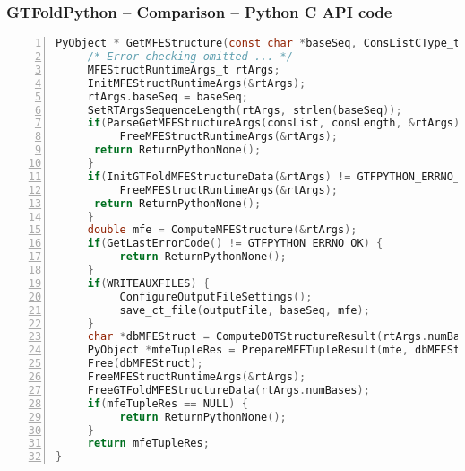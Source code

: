 \documentclass[usenames,svgnames,dvipsnames,11pt]{beamer}
\begin{document}
\begin{frame}[fragile]
\frametitle{GTFoldPython -- Comparison -- Python C API code}

\begin{lstlisting}[language=C,basicstyle=\tiny\ttfamily,keywordstyle=\bfseries\color{green!40!black},
                   commentstyle=\itshape\color{purple!40!black},identifierstyle=\color{blue!63!green},
                   stringstyle=\color{orange},frame=none,keepspaces=true,numbers=left,xleftmargin=0.28cm]
PyObject * GetMFEStructure(const char *baseSeq, ConsListCType_t consList, int consLength) {
     /* Error checking omitted ... */
     MFEStructRuntimeArgs_t rtArgs;
     InitMFEStructRuntimeArgs(&rtArgs);
     rtArgs.baseSeq = baseSeq;
     SetRTArgsSequenceLength(rtArgs, strlen(baseSeq));
     if(ParseGetMFEStructureArgs(consList, consLength, &rtArgs) != GTFPYTHON_ERRNO_OK) {
          FreeMFEStructRuntimeArgs(&rtArgs);
	  return ReturnPythonNone();
     }
     if(InitGTFoldMFEStructureData(&rtArgs) != GTFPYTHON_ERRNO_OK) {
          FreeMFEStructRuntimeArgs(&rtArgs);
	  return ReturnPythonNone();
     }
     double mfe = ComputeMFEStructure(&rtArgs);
     if(GetLastErrorCode() != GTFPYTHON_ERRNO_OK) {
          return ReturnPythonNone();
     }
     if(WRITEAUXFILES) {
          ConfigureOutputFileSettings();
          save_ct_file(outputFile, baseSeq, mfe);
     }
     char *dbMFEStruct = ComputeDOTStructureResult(rtArgs.numBases);
     PyObject *mfeTupleRes = PrepareMFETupleResult(mfe, dbMFEStruct);
     Free(dbMFEStruct);
     FreeMFEStructRuntimeArgs(&rtArgs);
     FreeGTFoldMFEStructureData(rtArgs.numBases);
     if(mfeTupleRes == NULL) {
          return ReturnPythonNone();
     }
     return mfeTupleRes;
}
\end{lstlisting}

\end{frame}
\end{document}
